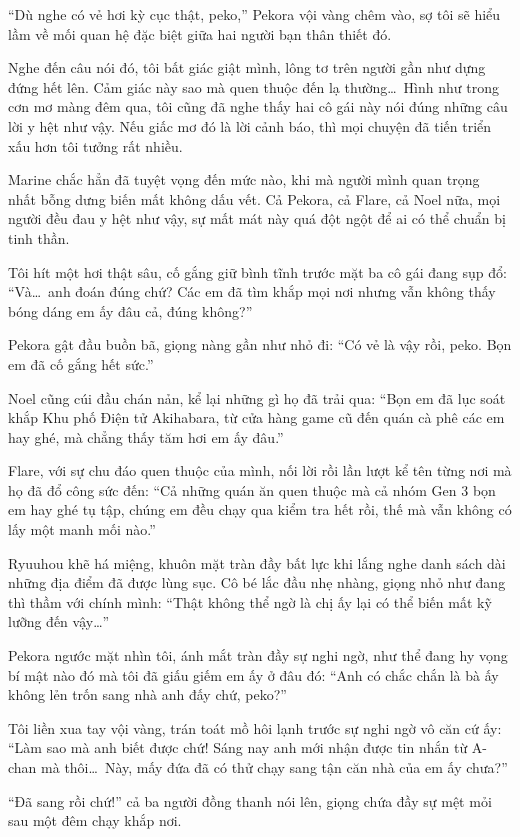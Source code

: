\documentclass[../main.tex]{subfiles}
\begin{document}
``Dù nghe có vẻ hơi kỳ cục thật, peko,'' Pekora vội vàng chêm vào, sợ tôi sẽ hiểu lầm về mối quan hệ đặc biệt giữa hai người bạn thân thiết đó.

Nghe đến câu nói đó, tôi bất giác giật mình, lông tơ trên người gần như dựng đứng hết lên. Cảm giác này sao mà quen thuộc đến lạ thường\dots\ Hình như trong cơn mơ màng đêm qua, tôi cũng đã nghe thấy hai cô gái này nói đúng những câu lời y hệt như vậy. Nếu giấc mơ đó là lời cảnh báo, thì mọi chuyện đã tiến triển xấu hơn tôi tưởng rất nhiều.

Marine chắc hẳn đã tuyệt vọng đến mức nào, khi mà người mình quan trọng nhất bỗng dưng biến mất không dấu vết. Cả Pekora, cả Flare, cả Noel nữa, mọi người đều đau y hệt như vậy, sự mất mát này quá đột ngột để ai có thể chuẩn bị tinh thần.

Tôi hít một hơi thật sâu, cố gắng giữ bình tĩnh trước mặt ba cô gái đang sụp đổ: ``Và\dots\ anh đoán đúng chứ? Các em đã tìm khắp mọi nơi nhưng vẫn không thấy bóng dáng em ấy đâu cả, đúng không?''

Pekora gật đầu buồn bã, giọng nàng gần như nhỏ đi: ``Có vẻ là vậy rồi, peko. Bọn em đã cố gắng hết sức.''

Noel cũng cúi đầu chán nản, kể lại những gì họ đã trải qua: ``Bọn em đã lục soát khắp Khu phố Điện tử Akihabara, từ cửa hàng game cũ đến quán cà phê các em hay ghé, mà chẳng thấy tăm hơi em ấy đâu.''

Flare, với sự chu đáo quen thuộc của mình, nối lời rồi lần lượt kể tên từng nơi mà họ đã đổ công sức đến: ``Cả những quán ăn quen thuộc mà cả nhóm Gen 3 bọn em hay ghé tụ tập, chúng em đều chạy qua kiểm tra hết rồi, thế mà vẫn không có lấy một manh mối nào.''

Ryuuhou khẽ há miệng, khuôn mặt tràn đầy bất lực khi lắng nghe danh sách dài những địa điểm đã được lùng sục. Cô bé lắc đầu nhẹ nhàng, giọng nhỏ như đang thì thầm với chính mình: ``Thật không thể ngờ là chị ấy lại có thể biến mất kỹ lưỡng đến vậy\dots''

Pekora ngước mặt nhìn tôi, ánh mắt tràn đầy sự nghi ngờ, như thể đang hy vọng bí mật nào đó mà tôi đã giấu giếm em ấy ở đâu đó: ``Anh có chắc chắn là bà ấy không lẻn trốn sang nhà anh đấy chứ, peko?''

Tôi liền xua tay vội vàng, trán toát mồ hôi lạnh trước sự nghi ngờ vô căn cứ ấy: ``Làm sao mà anh biết được chứ! Sáng nay anh mới nhận được tin nhắn từ A-chan mà thôi\dots\ Này, mấy đứa đã có thử chạy sang tận căn nhà của em ấy chưa?''

``Đã sang rồi chứ!'' cả ba người đồng thanh nói lên, giọng chứa đầy sự mệt mỏi sau một đêm chạy khắp nơi.
\end{document}
